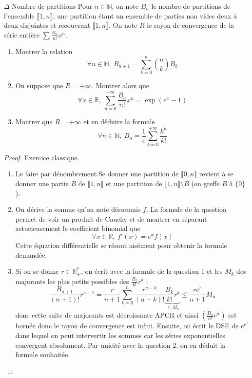 \documentclass[french,a4paper]{article}
\newcommand{\N}{\mathbb{N}}
\newcommand{\R}{\mathbb{R}}
\newcommand{\st}{^*}
\theoremstyle{plain}
\theoremstyle{definition}
\theoremstyle{remark}
\begin{document}
\begin{ex}[Moulin.SE.47]{$\Delta$ Nombre de partitions}
	Pour $n\in\N$, on note $B_n$ le nombre de partitions de l'ensemble $\llbracket1,n\rrbracket$, une partition étant un ensemble de parties non vides deux à deux disjointes et recouvrant $\llbracket1,n\rrbracket$. On note $R$ le rayon de convergence de la série entière $\displaystyle\sum\frac{B_n}{n!}x^n$.
	\begin{enumerate}
		\item Montrer la relation $$\forall n\in\N,\ B_{n+1}=\sum_{k=0}^{n}\binom{n}{k}B_k$$
		\item On suppose que $R=+\infty$. Montrer alors que $$\forall x\in\R,\ \sum_{n=0}^{+\infty}\frac{B_n}{n!}x^n=\exp(e^x-1)$$
		\item Montrer que $R=+\infty$ et en déduire la formule $$\forall n\in\N,\ B_n=\frac{1}{e}\sum_{k=0}^{+\infty}\frac{k^n}{k!}$$
	\end{enumerate}
\end{ex}
\begin{proof}
	Exercice classique.
	\begin{enumerate}
		\item Le faire par dénombrement.Se donner une partition de $\llbracket0,n\rrbracket$ revient à se donner une partie $B$ de $\llbracket1,n\rrbracket$ et une partition de $\llbracket1,n\rrbracket\setminus B$ (on greffe $B$ à $\{0\}$).
		\item On dérive la somme qu'on note désormais $f$. La formule de la question permet de voir un produit de Cauchy et de montrer en séparant astucieusement le coefficient binomial que $$\forall x\in\R,\ f'(x)=e^xf(x)$$ Cette équation différentielle se résout aisément pour obtenir la formule demandée.
		\item Si on se donne $r\in\R_+\st$, on écrit avec la formule de la question $1$ et les $M_k$ des majorants les plus petits possibles des $\displaystyle\frac{B_k}{k!}r^k$ : $$\frac{B_{n+1}}{(n+1)!}r^{n+1}=\frac{r}{n+1}\sum_{k=0}^{n}\frac{r^{n-k}}{(n-k)!}\underbrace{\frac{B_k}{k!}r^k}_{\leqslant M_k}\leqslant \frac{re^r}{n+1}M_n$$ donc cette suite de majorants est décroissante APCR et ainsi $\displaystyle\left(\frac{B_n}{n!}r^n\right)$ est bornée donc le rayon de convergence est infini. Ensuite, on écrit le DSE de $e^{e^x}$ dans lequel on peut intervertir les sommes car les séries exponentielles convergent absolument. Par unicité avec la question 2, on en déduit la formule souhaitée.
	\end{enumerate}
\end{proof}
\end{document}
